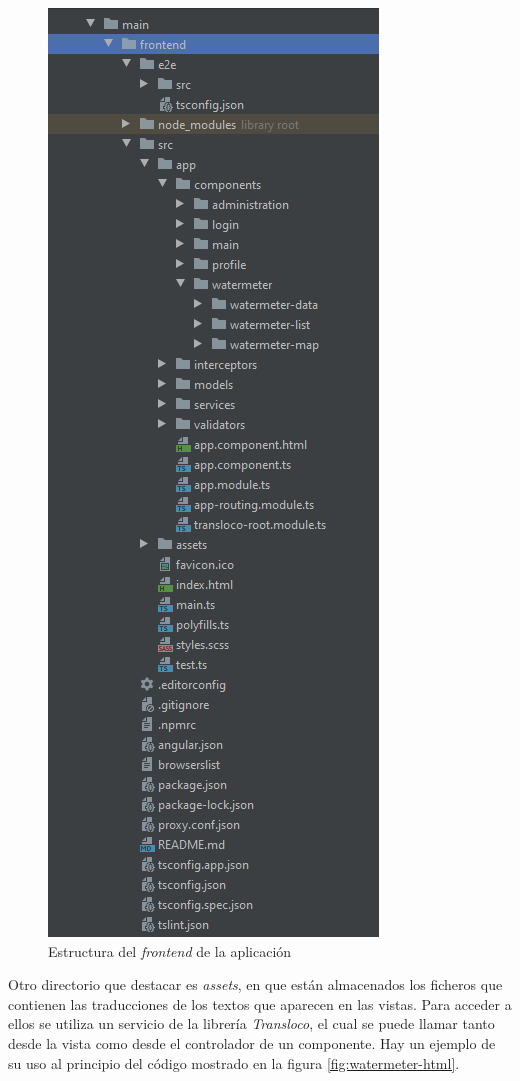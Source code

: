 \documentclass[pdftex,11pt,a4paper]{book}
\begin{document}
 \begin{figure}[H]
 \centering
 \includegraphics [scale=0.90] {images/implementacion/estructura-frontend.png}
 \caption{Estructura del \textit{frontend} de la aplicación} \label{fig:estructura-frontend}
 \end{figure}

Otro directorio que destacar es \textit{assets}, en que están almacenados los ficheros que contienen las traducciones de los textos que aparecen en las vistas. Para acceder a ellos se utiliza un servicio de la librería \textit{Transloco}, el cual se puede llamar tanto desde la vista como desde el controlador de un componente. Hay un ejemplo de su uso al principio del código mostrado en la figura \ref{fig:watermeter-html}.
\end{document}
